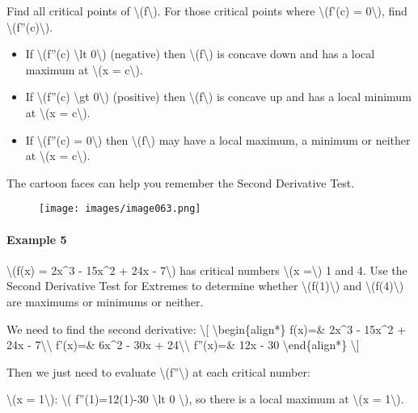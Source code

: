 Find all critical points of \textbackslash{}(f\textbackslash{}). For
those critical points where \textbackslash{}(f'(c) = 0\textbackslash{}),
find \textbackslash{}(f''(c)\textbackslash{}).

\begin{itemize}
\tightlist
\item
  If \textbackslash{}(f''(c) \textbackslash{}lt 0\textbackslash{})
  (negative) then \textbackslash{}(f\textbackslash{}) is concave down
  and has a local maximum at \textbackslash{}(x = c\textbackslash{}).
\item
  If \textbackslash{}(f''(c) \textbackslash{}gt 0\textbackslash{})
  (positive) then \textbackslash{}(f\textbackslash{}) is concave up and
  has a local minimum at \textbackslash{}(x = c\textbackslash{}).
\item
  If \textbackslash{}(f''(c) = 0\textbackslash{}) then
  \textbackslash{}(f\textbackslash{}) may have a local maximum, a
  minimum or neither at \textbackslash{}(x = c\textbackslash{}).
\end{itemize}

The cartoon faces can help you remember the Second Derivative Test.

\begin{figure}
\centering
\texttt{[image: images/image063.png]}
\caption{}
\end{figure}

\hypertarget{example-5}{%
\paragraph{Example 5}\label{example-5}}

\textbackslash{}(f(x) = 2x\^{}3 - 15x\^{}2 + 24x - 7\textbackslash{})
has critical numbers \textbackslash{}(x =\textbackslash{}) 1 and 4. Use
the Second Derivative Test for Extremes to determine whether
\textbackslash{}(f(1)\textbackslash{}) and
\textbackslash{}(f(4)\textbackslash{}) are maximums or minimums or
neither.

We need to find the second derivative: \textbackslash{}{[}
\textbackslash{}begin\{align*\} f(x)=\& 2x\^{}3 - 15x\^{}2 + 24x -
7\textbackslash{}\textbackslash{} f'(x)=\& 6x\^{}2 - 30x +
24\textbackslash{}\textbackslash{} f''(x)=\& 12x - 30
\textbackslash{}end\{align*\} \textbackslash{}{]}

Then we just need to evaluate \textbackslash{}(f''\textbackslash{}) at
each critical number:

\textbackslash{}(x = 1\textbackslash{}): \textbackslash{}(
f''(1)=12(1)-30 \textbackslash{}lt 0 \textbackslash{}), so there is a
local maximum at \textbackslash{}(x = 1\textbackslash{}).

